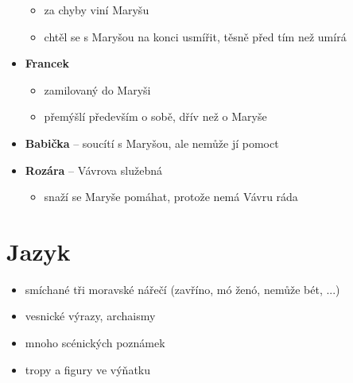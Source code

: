 \documentclass[10pt,a4paper]{article}
\begin{document}
\begin{itemize}
\begin{itemize}
	\item za chyby viní Maryšu
	\item chtěl se s Maryšou na konci usmířit, těsně před tím než umírá
	\end{itemize}
\item \textbf{Francek}
	\begin{itemize}
	\item zamilovaný do Maryši
	\item přemýšlí především o sobě, dřív než o Maryše
	\end{itemize}
\item \textbf{Babička} -- soucítí s Maryšou, ale nemůže jí pomoct
\item \textbf{Rozára} -- Vávrova služebná
	\begin{itemize}
	\item snaží se Maryše pomáhat, protože nemá Vávru ráda
	\end{itemize}
\end{itemize}
\section*{Jazyk}
\begin{itemize}
\item smíchané tři moravské nářečí (zavříno, mó ženó, nemůže bét, ...)
\item vesnické výrazy, archaismy
\item mnoho scénických poznámek
\item tropy a figury ve výňatku
\end{itemize}
\end{document}
